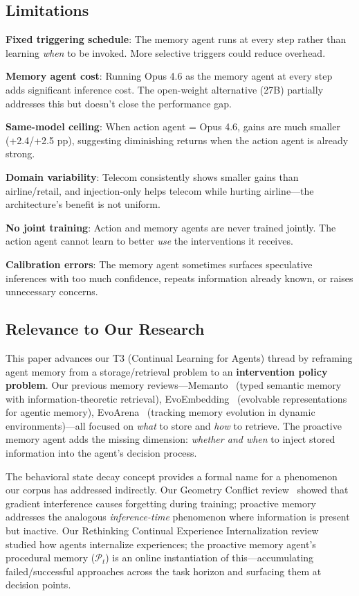 \documentclass[11pt,a4paper]{article}
\begin{document}
\subsection{Limitations}

\textbf{Fixed triggering schedule}: The memory agent runs at every step rather than learning \emph{when} to be invoked. More selective triggers could reduce overhead.

\textbf{Memory agent cost}: Running Opus 4.6 as the memory agent at every step adds significant inference cost. The open-weight alternative (27B) partially addresses this but doesn't close the performance gap.

\textbf{Same-model ceiling}: When action agent = Opus 4.6, gains are much smaller (+2.4/+2.5 pp), suggesting diminishing returns when the action agent is already strong.

\textbf{Domain variability}: Telecom consistently shows smaller gains than airline/retail, and injection-only helps telecom while hurting airline---the architecture's benefit is not uniform.

\textbf{No joint training}: Action and memory agents are never trained jointly. The action agent cannot learn to better \emph{use} the interventions it receives.

\textbf{Calibration errors}: The memory agent sometimes surfaces speculative inferences with too much confidence, repeats information already known, or raises unnecessary concerns.

\subsection{Relevance to Our Research}

This paper advances our T3 (Continual Learning for Agents) thread by reframing agent memory from a storage/retrieval problem to an \textbf{intervention policy problem}. Our previous memory reviews---Memanto~\cite{memanto2026} (typed semantic memory with information-theoretic retrieval), EvoEmbedding~\cite{evoembedding2026} (evolvable representations for agentic memory), EvoArena~\cite{evoarena2026} (tracking memory evolution in dynamic environments)---all focused on \emph{what} to store and \emph{how} to retrieve. The proactive memory agent adds the missing dimension: \emph{whether and when} to inject stored information into the agent's decision process.

The behavioral state decay concept provides a formal name for a phenomenon our corpus has addressed indirectly. Our Geometry Conflict review~\cite{geomconflict2026} showed that gradient interference causes forgetting during training; proactive memory addresses the analogous \emph{inference-time} phenomenon where information is present but inactive. Our Rethinking Continual Experience Internalization review~\cite{rethinking2026} studied how agents internalize experiences; the proactive memory agent's procedural memory ($\mathcal{P}_t$) is an online instantiation of this---accumulating failed/successful approaches across the task horizon and surfacing them at decision points.
\end{document}
